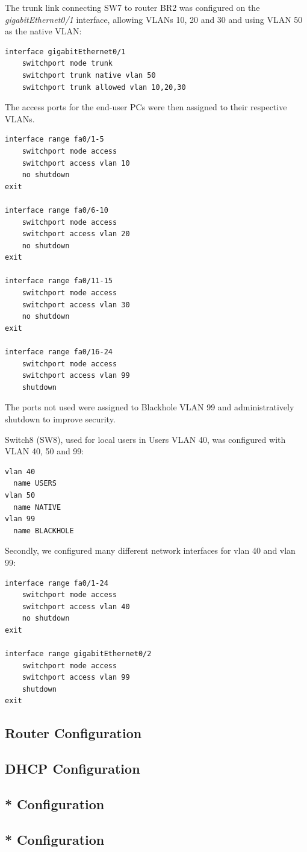 The trunk link connecting SW7 to router BR2 was configured on the \textit{gigabitEthernet0/1} interface, allowing VLANs 10, 20 and 30 and using VLAN 50 as the native VLAN:

\begin{lstlisting}[caption={Trunk configuration on SW7}, label={lst:sw7-trunk}]
interface gigabitEthernet0/1
    switchport mode trunk
    switchport trunk native vlan 50
    switchport trunk allowed vlan 10,20,30
\end{lstlisting}

The access ports for the end-user PCs were then assigned to their respective VLANs.

\begin{lstlisting}[caption={Access port configuration on SW7}, label={lst:sw7-access}]
interface range fa0/1-5
    switchport mode access
    switchport access vlan 10
    no shutdown
exit

interface range fa0/6-10
    switchport mode access
    switchport access vlan 20
    no shutdown
exit

interface range fa0/11-15
    switchport mode access
    switchport access vlan 30
    no shutdown
exit

interface range fa0/16-24
    switchport mode access
    switchport access vlan 99
    shutdown
\end{lstlisting}

The ports not used were assigned to Blackhole VLAN 99 and administratively shutdown to improve security.

Switch8 (SW8), used for local users in Users VLAN 40, was configured with VLAN 40, 50 and 99:

\begin{lstlisting}[caption={VLAN creation on SW8}, label={lst:sw8-vlan-creation}]
vlan 40
  name USERS
vlan 50
  name NATIVE
vlan 99
  name BLACKHOLE
\end{lstlisting}


Secondly, we configured many different network interfaces for vlan 40 and vlan 99:

\begin{lstlisting}[caption={Access port configuration on SW8}, label={lst:sw8-access}]
interface range fa0/1-24
    switchport mode access
    switchport access vlan 40
    no shutdown
exit

interface range gigabitEthernet0/2
    switchport mode access
    switchport access vlan 99
    shutdown
exit    
\end{lstlisting}

\subsection*{Router Configuration}

\subsection*{DHCP Configuration}

\subsection*{* Configuration}

\subsection*{* Configuration}